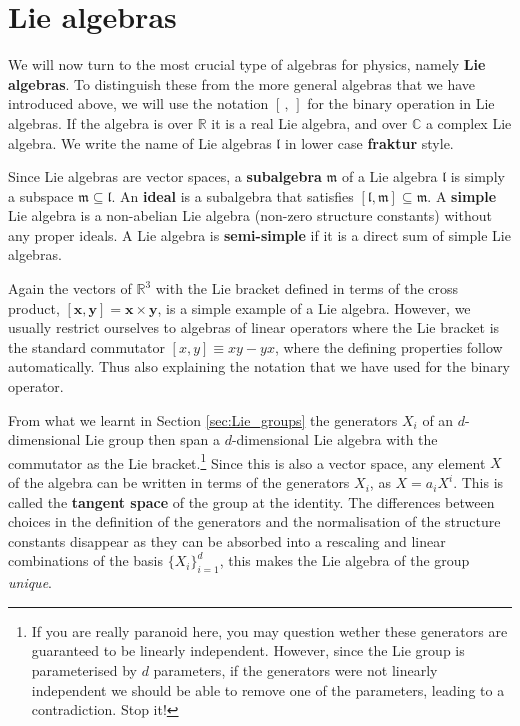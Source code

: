 \documentclass[notes.tex]{subfiles}
\begin{document}
\section{Lie algebras}
\label{sec:lie_algebras}
We will now turn to the most crucial type of algebras for physics, namely {\bf Lie algebras}. To distinguish these from the more general algebras that we have introduced above, we will use the notation $[\,,\,]$ for the binary operation in Lie algebras. 
If the algebra is over $\mathbb R$ it is a real Lie algebra, and over $\mathbb C$ a complex Lie algebra. We write the name of Lie algebras $\mathfrak l$  in lower case {\bf fraktur} style.

Since Lie algebras are vector spaces, a {\bf subalgebra} $\mathfrak m$  of a Lie algebra $\mathfrak l$ is simply a subspace $\mathfrak m\subseteq \mathfrak l$. An {\bf ideal} is a subalgebra that satisfies $[\mathfrak l, \mathfrak m] \subseteq \mathfrak m$. A {\bf simple} Lie algebra is a non-abelian Lie algebra (non-zero structure constants)  without any proper ideals. A Lie algebra is {\bf semi-simple} if it is a direct sum of simple Lie algebras.

Again the vectors of $\mathbb{R}^3$ with the Lie bracket defined in terms of the cross product, $[\mathbf x, \mathbf y]=\mathbf x \times \mathbf y$, is a simple example of a Lie algebra. However, we usually restrict ourselves to algebras of linear operators where the Lie bracket is the standard commutator $[x,y] \equiv xy-yx$, where the defining properties follow automatically. Thus also explaining the notation that we have used for the binary operator. 

From what we learnt in Section \ref{sec:Lie_groups} the generators $X_i$ of an $d$-dimensional Lie group then span a $d$-dimensional Lie algebra with the commutator as the Lie bracket.\footnote{If you are really paranoid here, you may question wether these generators are guaranteed to be linearly independent. However, since the Lie group is parameterised by $d$ parameters, if the generators were not linearly independent we should be able to remove one of the parameters, leading to a contradiction. Stop it!} Since this is also a vector space, any element $X$ of the algebra can be written in terms of the generators $X_i$, as $X=a_iX^i$. This is called the {\bf tangent space} of the group at the identity. The differences between choices in the definition of the generators and the normalisation of the structure constants disappear as they can be absorbed into a rescaling and linear combinations of the basis $\{X_i\}_{i=1}^d$, this makes the Lie algebra of the group {\it unique}.
\end{document}
